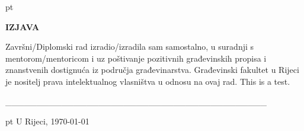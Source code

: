 \thispagestyle{empty}
\mbox{}
\thispagestyle{empty}


 pt

\begin{center}
{\fontsize{14pt}{16.8pt}\selectfont \textbf{IZJAVA}\par}\par
\end{center}\par

\vspace{\baselineskip}

\vspace{\baselineskip}

\begin{justify}
	\begin{onehalfspace}
Završni/Diplomski rad izradio/izradila sam samostalno, u suradnji s mentorom/mentoricom i uz poštivanje pozitivnih građevinskih propisa i znanstvenih dostignuća iz područja građevinarstva. Građevinski fakultet u Rijeci je nositelj prava intelektualnog vlasništva u odnosu na ovaj rad.
This is a test.
	\end{onehalfspace}

\end{justify}\par

\vspace{\baselineskip}

\vspace{\baselineskip}

\vspace{\baselineskip}
\_\_\_\_\_\_\_\_\_\_\_\_\_\_\_\_\_\_\_\_\_\_\_\_\_\_\_\_\_\_\_\_\_\_\_\_\_\_\_\_\_\_ \par

{\autor}\par



 pt
U Rijeci, {\today}\par

\newpage

\thispagestyle{empty}
\mbox{}
\thispagestyle{empty}